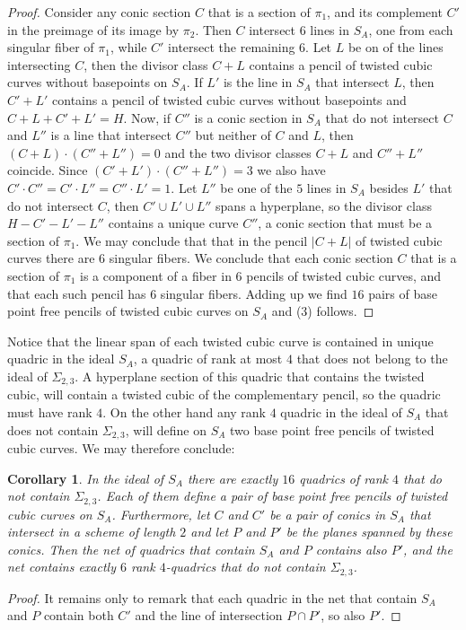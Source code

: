 \documentclass[a4paper,11pt]{amsart}
\newtheorem{cor}[thm]{Corollary}
\theoremstyle{definition}
\numberwithin{equation}{section}
\numberwithin{equation}{section} \theoremstyle{definition}
\begin{document}
\begin{proof}
Consider any conic  section $C$ that is a section of $\pi_1$, and its complement $C'$ in the preimage of its image by $\pi_2$.  Then $C$ intersect $6$ lines in $S_A$, one from each singular fiber of $\pi_1$, while $C'$ intersect the remaining $6$.  Let $L$ be on of the lines intersecting $C$, then the divisor class $C+L$ contains a pencil of twisted cubic curves without basepoints on $S_A$.  If $L'$ is the line in $S_A$ that intersect $L$, then $C'+L'$ contains a  pencil of twisted cubic curves without basepoints and $C+L+C'+L'=H$.  Now, if $C''$ is a conic section in $S_A$ that do not intersect $C$ and $L''$ is a line that intersect $C''$ but neither of $C$ and $L$, then $(C+L)\cdot (C''+L'')=0$ and the two divisor classes $C+L$ and $C''+L''$ coincide.   Since  $(C'+L')\cdot (C''+L'')=3$  we also have $C'\cdot C''=C'\cdot L''=C''\cdot L'=1$.
Let $L''$ be one of the $5$ lines in $S_A$ besides $L'$ that do not intersect $C$, then $C'\cup L'\cup L''$ spans a hyperplane, so the divisor class $H-C'-L'-L''$ contains a unique curve $C''$, a conic section that must be a section of $\pi_1$.  We may conclude that that in the pencil $|C+L|$ of twisted cubic curves there are $6$ singular fibers.  We conclude that each conic section $C$ that is a section of $\pi_1$ is a component of a fiber in $6$ pencils of twisted cubic curves, and that each such pencil has $6$ singular fibers.  Adding up we find $16$ pairs of base point free pencils of twisted cubic curves on $S_A$ and (3) follows.
\end{proof}
Notice that the linear span of each twisted cubic curve is contained in unique quadric in the ideal  $S_A$, a quadric of rank at most $4$ that does not belong to the ideal of $\Sigma_{2,3}$.  A hyperplane section of this quadric that contains the twisted cubic, will contain a twisted cubic of the complementary pencil, so the quadric must have rank $4$. On the other hand any rank $4$ quadric in the ideal of $S_A$ that does not contain $\Sigma_{2,3}$, will define on $S_A$ two base point free pencils of twisted cubic curves. We may therefore conclude:
\begin{cor}  In the ideal of $S_A$ there are exactly $16$ quadrics of rank $4$ that do not contain  $\Sigma_{2,3}$. Each of them define a pair of base point free pencils of twisted cubic curves on $S_A$.  Furthermore, let $C$ and $C'$ be a pair of conics in $S_A$ that intersect in a scheme of length $2$ and let $P$ and $P'$ be the planes spanned by these conics. Then the net of quadrics that contain $S_A$ and $P$ contains also $P'$, and the net contains exactly $6$ rank $4$-quadrics that do not contain  $\Sigma_{2,3}$.  
\end{cor}
\begin{proof} It remains only to remark that each quadric in the net that contain $S_A$ and $P$ contain both $C'$ and the line of intersection $P\cap P'$, so also $P'$.
\end{proof}
\end{document}
